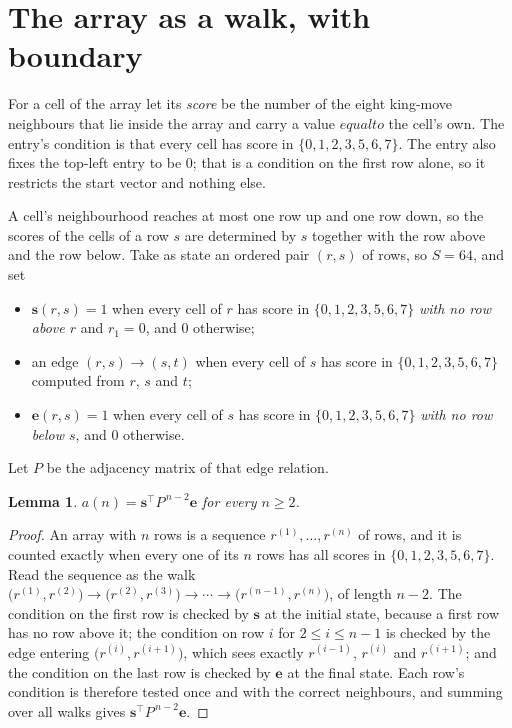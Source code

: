 \documentclass[11pt,a4paper]{article}
\theoremstyle{plain}
\newtheorem{lemma}[theorem]{Lemma}
\theoremstyle{definition}
\begin{document}
\section{The array as a walk, with boundary}

For a cell of the array let its \emph{score} be the number of the eight king-move neighbours that lie inside
the array and carry a value $equal to$ the cell's own. The entry's condition is that every cell
has score in $\{0,1,2,3,5,6,7\}$. The entry also fixes the top-left entry to be $0$; that is a condition on the first row alone, so it restricts the start vector and nothing else.

A cell's neighbourhood reaches at most one row up and one row down, so the scores of the
cells of a row $s$ are determined by $s$ together with the row above and the row below.
Take as state an ordered pair $(r,s)$ of rows, so $S=64$, and set
\begin{itemize}
\item $\mathbf{s}(r,s)=1$ when every cell of $r$ has score in $\{0,1,2,3,5,6,7\}$ \emph{with no row
above $r$} and $r_1=0$, and $0$ otherwise;
\item an edge $(r,s)\to(s,t)$ when every cell of $s$ has score in $\{0,1,2,3,5,6,7\}$ computed from
$r$, $s$ and $t$;
\item $\mathbf{e}(r,s)=1$ when every cell of $s$ has score in $\{0,1,2,3,5,6,7\}$ \emph{with no row
below $s$}, and $0$ otherwise.
\end{itemize}
Let $P$ be the adjacency matrix of that edge relation.

\begin{lemma}\label{lem:walk}
$a(n)=\mathbf{s}^{\!\top}P^{\,n-2}\mathbf{e}$ for every $n\ge2$.
\end{lemma}

\begin{proof}
An array with $n$ rows is a sequence $r^{(1)},\dots,r^{(n)}$ of rows, and it is counted
exactly when every one of its $n$ rows has all scores in $\{0,1,2,3,5,6,7\}$. Read the sequence as the
walk $\bigl(r^{(1)},r^{(2)}\bigr)\to\bigl(r^{(2)},r^{(3)}\bigr)\to\cdots\to
\bigl(r^{(n-1)},r^{(n)}\bigr)$, of length $n-2$. The condition on the first row is
checked by $\mathbf{s}$ at the initial state, because a first row has no row above it; the
condition on row $i$ for $2\le i\le n-1$ is checked by the edge entering
$\bigl(r^{(i)},r^{(i+1)}\bigr)$, which sees exactly $r^{(i-1)}$, $r^{(i)}$ and
$r^{(i+1)}$; and the condition on the last row is checked by $\mathbf{e}$ at the final
state. Each row's condition is therefore tested once and with the correct neighbours, and
summing over all walks gives $\mathbf{s}^{\!\top}P^{\,n-2}\mathbf{e}$.
\end{proof}
\end{document}
